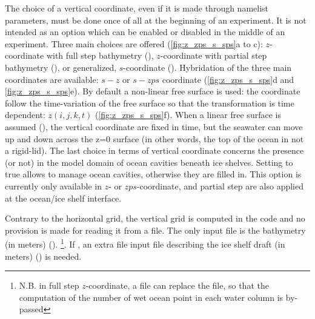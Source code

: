\documentclass[../tex_main/NEMO_manual]{subfiles}
\begin{document}
The choice of a vertical coordinate, even if it is made through  namelist parameters, 
must be done once of all at the beginning of an experiment. It is not intended as an 
option which can be enabled or disabled in the middle of an experiment. Three main 
choices are offered (\autoref{fig:z_zps_s_sps}a to c): $z$-coordinate with full step 
bathymetry (), $z$-coordinate with partial step bathymetry 
(), or generalized, $s$-coordinate (). 
Hybridation of the three main coordinates are available: $s-z$ or $s-zps$ coordinate 
(\autoref{fig:z_zps_s_sps}d and \autoref{fig:z_zps_s_sps}e). By default a non-linear free surface is used:
the coordinate follow the time-variation of the free surface so that the transformation is time dependent: 
$z(i,j,k,t)$ (\autoref{fig:z_zps_s_sps}f). When a linear free surface is assumed (), 
the vertical coordinate are fixed in time, but the seawater can move up and down across the z=0 surface 
(in other words, the top of the ocean in not a rigid-lid). 
The last choice in terms of vertical coordinate concerns the presence (or not) in the model domain 
of ocean cavities beneath ice shelves. Setting  to true allows to manage ocean cavities, 
otherwise they are filled in. This option is currently only available in $z$- or $zps$-coordinate,
and partial step are also applied at the ocean/ice shelf interface. 

Contrary to the horizontal grid, the vertical grid is computed in the code and no 
provision is made for reading it from a file. The only input file is the bathymetry 
(in meters) (). 
\footnote{N.B. in full step $z$-coordinate, a  file can replace the 
 file, so that the computation of the number of wet ocean point 
in each water column is by-passed}. 
If , an extra file input file describing the ice shelf draft 
(in meters) () is needed.
\end{document}
